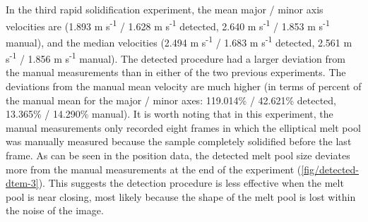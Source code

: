 In the third rapid solidification experiment, the mean major / minor axis
velocities are (1.893 m s\textsuperscript{-1} / 1.628 m s\textsuperscript{-1}
detected, 2.640 m s\textsuperscript{-1} / 1.853 m s\textsuperscript{-1} manual),
and the median velocities
(2.494 m s\textsuperscript{-1} / 1.683 m s\textsuperscript{-1} detected,
2.561 m s\textsuperscript{-1} / 1.856 m s\textsuperscript{-1} manual).
The detected procedure had a larger deviation from the manual measurements
than in either of the two previous experiments. The deviations from the
manual mean velocity are much higher (in terms of percent of the manual
mean for the major / minor axes:
119.014\% / 42.621\% detected, 13.365\% / 14.290\% manual).
It is worth noting that in this experiment,
the manual measurements only recorded eight frames
in which the elliptical melt pool was manually measured because the sample
completely solidified before the last frame. As can be seen in the position
data, the detected melt pool size deviates more from the manual measurements
at the end of the experiment (\ref{fig/detected-dtem-3}).
This suggests the detection procedure is less effective when the melt pool is
near closing, most likely because the shape of the melt pool is lost within
the noise of the image.

